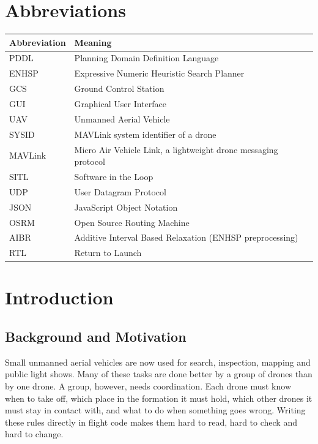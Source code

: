 \documentclass[11pt,a4paper,oneside]{report}
\newcommand{\addfront}[1]{%
  \addtocontents{toc}{\protect\noindent\protect\rule{0pt}{1.5em}\protect\textbf{#1}\protect\hfill\protect\textbf{\thepage}\protect\par}}
\begin{document}
\chapter*{Abbreviations}
\addfront{ABBREVIATIONS}
\begin{center}
\begin{tabular}{@{}p{}p{}@{}}
\toprule
\textbf{Abbreviation} & \textbf{Meaning} \\
\midrule
PDDL   & Planning Domain Definition Language \\
ENHSP  & Expressive Numeric Heuristic Search Planner \\
GCS    & Ground Control Station \\
GUI    & Graphical User Interface \\
UAV    & Unmanned Aerial Vehicle \\
SYSID  & MAVLink system identifier of a drone \\
MAVLink& Micro Air Vehicle Link, a lightweight drone messaging protocol \\
SITL   & Software in the Loop \\
UDP    & User Datagram Protocol \\
JSON   & JavaScript Object Notation \\
OSRM   & Open Source Routing Machine \\
AIBR   & Additive Interval Based Relaxation (ENHSP preprocessing) \\
RTL    & Return to Launch \\
\bottomrule
\end{tabular}
\end{center}

\clearpage
{}

\chapter{Introduction}

\section{Background and Motivation}
Small unmanned aerial vehicles are now used for search, inspection, mapping and public light
shows. Many of these tasks are done better by a group of drones than by one drone. A group,
however, needs coordination. Each drone must know when to take off, which place in the
formation it must hold, which other drones it must stay in contact with, and what to do when
something goes wrong. Writing these rules directly in flight code makes them hard to read, hard
to check and hard to change.
\end{document}
